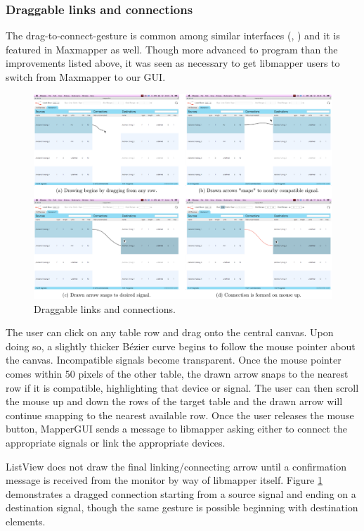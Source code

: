 		\subsubsection{Draggable links and connections}

The drag-to-connect-gesture is common among similar interfaces (, ) and it is featured in Maxmapper as well. Though more advanced to program than the improvements listed above, it was seen as necessary to get libmapper users to switch from Maxmapper to our GUI.

\begin{figure}[h]
	\centering
	\includegraphics[width=1\textwidth]{figures/drawing}
	\caption{Draggable links and connections.}
	\label{fig:drawing}
\end{figure}

The user can click on any table row and drag onto the central canvas. Upon doing so, a slightly thicker B\'ezier curve begins to follow the mouse pointer about the canvas. Incompatible signals become transparent. Once the mouse pointer comes within 50 pixels of the other table, the drawn arrow snaps to the nearest row if it is compatible, highlighting that device or signal. The user can then scroll the mouse up and down the rows of the target table and the drawn arrow will continue snapping to the nearest available row. Once the user releases the mouse button, MapperGUI sends a message to libmapper asking either to connect the appropriate signals or link the appropriate devices.

ListView does not draw the final linking/connecting arrow until a confirmation message is received from the monitor by way of libmapper itself. Figure \ref{fig:drawing} demonstrates a dragged connection starting from a source signal and ending on a destination signal, though the same gesture is possible beginning with destination elements.

